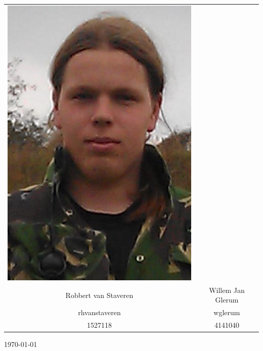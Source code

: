 \begin{titlepage}
\begin{center}
\begin{table}[ht]
\begin{tabular}{cc}
\includegraphics[scale=0.2]{../photos/willem.png}  \\
Robbert van Staveren	& Willem Jan Glerum\\
rhvanstaveren 			& wglerum\\
1527118					& 4141040\\
\end{tabular}
\end{table}

\vfill
{\large \today}
\end{center}

\end{titlepage}